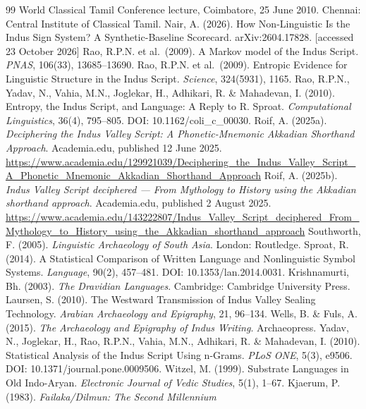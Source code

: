 \documentclass[11pt]{article}
\begin{document}
\begin{thebibliography}{99}
  World Classical Tamil Conference lecture, Coimbatore, 25 June 2010.
  Chennai: Central Institute of Classical Tamil.
  Nair, A. (2026). How Non-Linguistic Is the Indus Sign System? A Synthetic-Baseline Scorecard. arXiv:2604.17828. [accessed 23 October 2026]
  Rao, R.P.N. et al.~(2009). A Markov model of the Indus Script.
  \emph{PNAS}, 106(33), 13685--13690.
  Rao, R.P.N. et al.~(2009). Entropic Evidence for Linguistic Structure
  in the Indus Script. \emph{Science}, 324(5931), 1165.
  Rao, R.P.N., Yadav, N., Vahia, M.N., Joglekar, H., Adhikari, R. \& Mahadevan, I. (2010). Entropy, the Indus Script, and Language: A Reply to R. Sproat. \emph{Computational Linguistics}, 36(4), 795--805. DOI: 10.1162/coli\_c\_00030.
  Roif, A. (2025a). \emph{Deciphering the Indus Valley Script: A
  Phonetic-Mnemonic Akkadian Shorthand Approach}. Academia.edu,
  published 12 June 2025.
  \url{https://www.academia.edu/129921039/Deciphering_the_Indus_Valley_Script_A_Phonetic_Mnemonic_Akkadian_Shorthand_Approach}
  Roif, A. (2025b). \emph{Indus Valley Script deciphered --- From
  Mythology to History using the Akkadian shorthand approach}.
  Academia.edu, published 2 August 2025.
  \url{https://www.academia.edu/143222807/Indus_Valley_Script_deciphered_From_Mythology_to_History_using_the_Akkadian_shorthand_approach}
  Southworth, F. (2005). \emph{Linguistic Archaeology of South Asia}.
  London: Routledge.
  Sproat, R. (2014). A Statistical Comparison of Written Language and Nonlinguistic Symbol Systems. \emph{Language}, 90(2), 457--481. DOI: 10.1353/lan.2014.0031.
  Krishnamurti, Bh. (2003). \emph{The Dravidian Languages}. Cambridge:
  Cambridge University Press.
  Laursen, S. (2010). The Westward Transmission of Indus Valley Sealing
  Technology. \emph{Arabian Archaeology and Epigraphy}, 21, 96--134.
  Wells, B. \& Fuls, A. (2015). \emph{The Archaeology and Epigraphy of
  Indus Writing}. Archaeopress.
  Yadav, N., Joglekar, H., Rao, R.P.N., Vahia, M.N., Adhikari, R. \&
  Mahadevan, I. (2010). Statistical Analysis of the Indus Script Using
  n-Grams. \emph{PLoS ONE}, 5(3), e9506. DOI:
  10.1371/journal.pone.0009506.
  Witzel, M. (1999). Substrate Languages in Old Indo-Aryan.
  \emph{Electronic Journal of Vedic Studies}, 5(1), 1--67.
  Kjaerum, P. (1983). \emph{Failaka/Dilmun: The Second Millennium
}
\end{thebibliography}
\end{document}
